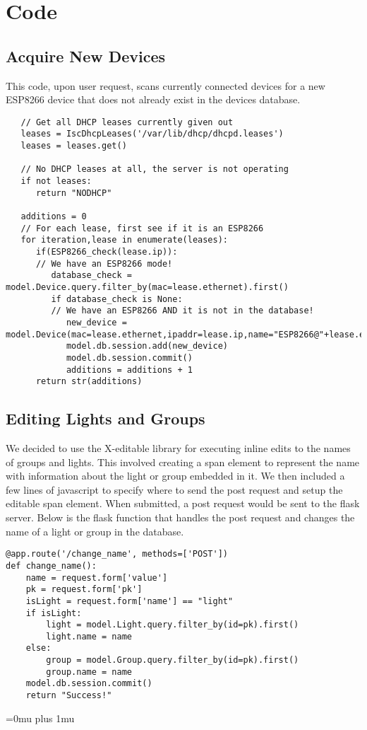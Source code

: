 \documentclass[oneside,openright]{book}
\begin{document}
\section{Code}
\subsection{Acquire New Devices}
This code, upon user request, scans currently connected devices for a new ESP8266 device that does not already exist in the devices database.
\begin{lstlisting}
   // Get all DHCP leases currently given out
   leases = IscDhcpLeases('/var/lib/dhcp/dhcpd.leases')
   leases = leases.get()

   // No DHCP leases at all, the server is not operating
   if not leases:
      return "NODHCP"

   additions = 0
   // For each lease, first see if it is an ESP8266
   for iteration,lease in enumerate(leases):
      if(ESP8266_check(lease.ip)):
      // We have an ESP8266 mode!
         database_check = model.Device.query.filter_by(mac=lease.ethernet).first()
         if database_check is None:
         // We have an ESP8266 AND it is not in the database!
            new_device = model.Device(mac=lease.ethernet,ipaddr=lease.ip,name="ESP8266@"+lease.ethernet)
            model.db.session.add(new_device)
            model.db.session.commit()
            additions = additions + 1
      return str(additions)
   \end{lstlisting}
\subsection{Editing Lights and Groups}
We decided to use the X-editable library for executing inline edits to the names of groups and lights. This involved creating a span element to represent the name with information about the light or group embedded in it. We then included a few lines of javascript to specify where to send the post request and setup the editable span element. When submitted, a post request would be sent to the flask server. Below is the flask function that handles the post request and changes the name of a light or group in the database.
\begin{lstlisting}
@app.route('/change_name', methods=['POST'])
def change_name():
    name = request.form['value']
    pk = request.form['pk']
    isLight = request.form['name'] == "light"
    if isLight:
        light = model.Light.query.filter_by(id=pk).first()
        light.name = name
    else:
        group = model.Group.query.filter_by(id=pk).first()
        group.name = name
    model.db.session.commit()
    return "Success!"
\end{lstlisting}
\newpage
\Urlmuskip=0mu plus 1mu\relax
{}

\end{document}
